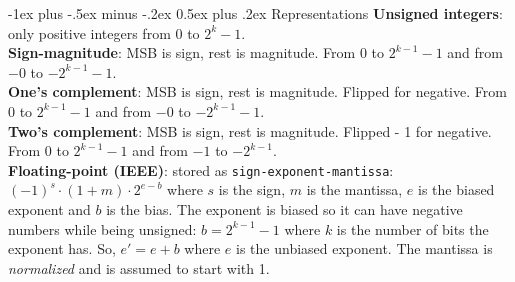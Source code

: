 \documentclass[10pt,landscape]{article}
\makeatletter
\renewcommand{\section}{\@startsection{section}{1}{0mm}%
                                {-1ex plus -.5ex minus -.2ex}%
                                {0.5ex plus .2ex}%
                                {\normalfont\scriptsize\bfseries}}
\makeatother
\begin{document}
\begin{multicols}{3}
\section{Representations}
\textbf{Unsigned integers}: only positive integers from $0$ to $2^k-1$.\\
\textbf{Sign-magnitude}: MSB is sign, rest is magnitude. From $0$ to $2^{k-1}-1$ and from $-0$ to $-2^{k-1}-1$.\\
\textbf{One's complement}: MSB is sign, rest is magnitude. Flipped for negative. From $0$ to $2^{k-1}-1$ and from $-0$ to $-2^{k-1}-1$.\\
\textbf{Two's complement}: MSB is sign, rest is magnitude. Flipped - 1 for negative. From $0$ to $2^{k-1}-1$ and from $-1$ to $-2^{k-1}$.\\
\textbf{Floating-point (IEEE)}: stored as \texttt{sign-exponent-mantissa}: $(-1)^s\cdot(1+m)\cdot 2^{e-b}$ where $s$ is the sign, $m$ is the mantissa, $e$ is the biased exponent and $b$ is the bias. The exponent is biased so it can have negative numbers while being unsigned: $b=2^{k-1}-1$ where $k$ is the number of bits the exponent has. So, $e'=e+b$ where $e$ is the unbiased exponent. The mantissa is \textit{normalized} and is assumed to start with 1.

\end{multicols}
\end{document}
